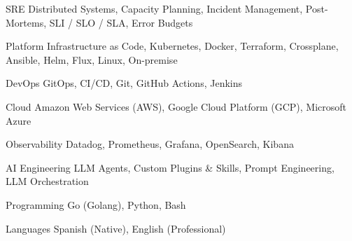 

\begin{cvskills}

  \cvskill
    {SRE} %
    {Distributed Systems, Capacity Planning, Incident Management, Post-Mortems, SLI / SLO / SLA, Error Budgets} %

  \cvskill
    {Platform} %
    {Infrastructure as Code, Kubernetes, Docker, Terraform, Crossplane, Ansible, Helm, Flux, Linux, On-premise} %

  \cvskill
    {DevOps} %
    {GitOps, CI/CD, Git, GitHub Actions, Jenkins} %

  \cvskill
    {Cloud} %
    {Amazon Web Services (AWS), Google Cloud Platform (GCP), Microsoft Azure} %

  \cvskill
    {Observability} %
    {Datadog, Prometheus, Grafana, OpenSearch, Kibana} %

  \cvskill
    {AI Engineering} %
    {LLM Agents, Custom Plugins \& Skills, Prompt Engineering, LLM Orchestration} %

  \cvskill
    {Programming} %
    {Go (Golang), Python, Bash} %

  \cvskill
    {Languages} %
    {Spanish (Native), English (Professional)} %

\end{cvskills}
